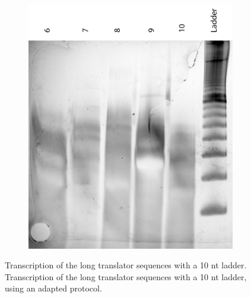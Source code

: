 \begin{figure}[h]
\begin{subfigure}[t]{0.49\textwidth}
  \includegraphics[width=\textwidth]{images/translator_transcription_long_2.png}
  \caption{}
  \label{translator_transcription_long_2}
\end{subfigure}
\caption{ Transcription of the long translator sequences with a 10 nt ladder.  Transcription of the long translator sequences with a 10 nt ladder, using an adapted protocol.}
\end{figure}

